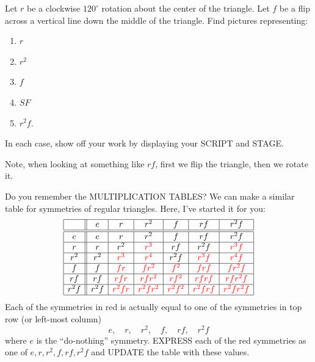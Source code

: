 \documentclass[noauthor,nooutcomes,12pt,handout,hints]{ximera}
\begin{document}
\begin{question}
  Let $r$ be a clockwise $120^\circ$ rotation about the center of the
  triangle. Let $f$ be a flip across a vertical line down the middle
  of the triangle. Find pictures representing:
  \begin{enumerate}
  \item $r$
  \item $r^2$
  \item $f$
  \item $SF$
  \item $r^2 f$.
  \end{enumerate}
  In each case, show off your work by displaying your SCRIPT and
  STAGE.
  \begin{hint}
    Note, when looking at something like $rf$, first we flip the
    triangle, then we rotate it. 
  \end{hint}
\end{question}
\mynewpage


\begin{question}
  Do you remember the MULTIPLICATION TABLES? We can make a similar
  table for symmetries of regular triangles. Here, I've started it for
  you:
  \[
  \begin{array}{|c||c|c|c|c|c|c|}
    \hline
      & e & r & r^2 & f & rf & r^2f\\ \hline\hline
    e & e & r & r^2 & f & rf & r^2f\\ \hline
    r & r & r^2 & \color{red}r^3 & rf & r^2f & \color{red}r^3f\\ \hline
    r^2 & r^2 & \color{red}r^3 & \color{red}r^4 & r^2f & \color{red}r^3f &\color{red} r^4f\\ \hline
    f  & f & \color{red}fr & \color{red}fr^2 & \color{red}f^2 & \color{red}frf & \color{red}fr^2f\\ \hline
    rf & rf & \color{red}rfr & \color{red}rfr^2 & \color{red}rf^2 & \color{red}rfrf & \color{red}rfr^2f\\ \hline
    r^2f & r^2f & \color{red}r^2fr & \color{red}r^2fr^2 & \color{red}r^2f^2 &\color{red} r^2frf &\color{red} r^2fr^2f\\ \hline
  \end{array}
  \]
  Each of the symmetries in red is actually equal to one of the
  symmetries in top row (or left-most column)
  \[
  e,\quad r,\quad r^2,\quad f,\quad rf,\quad r^2f
  \]
  where $e$ is the ``do-nothing'' symmetry. EXPRESS each of the red
  symmetries as one of $e,r,r^2,f,rf,r^2f$ and UPDATE the table with
  these values.
\end{question}
\end{document}
